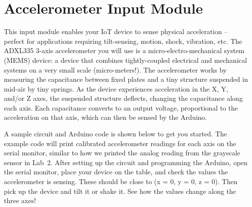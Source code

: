 
\clearpage
\section{Accelerometer Input Module}
\label{sec-input-accel}

This input module enables your IoT device to sense physical acceleration
-- perfect for applications requiring tilt-sensing, motion, shock,
vibration, etc. The ADXL335 3-axis accelerometer you will use is a
micro-electro-mechanical system (MEMS) device: a device that combines
tightly-coupled electrical and mechanical systems on a very small scale
(micro-meters!). The accelerometer works by measuring the capacitance
between fixed plates and a tiny structure suspended in mid-air by tiny
springs. As the device experiences acceleration in the X, Y, and/or Z
axes, the suspended structure deflects, changing the capacitance along
each axis. Each capacitance converts to an output voltage, proportional
to the acceleration on that axis, which can then be sensed by the
Arduino.

A sample circuit and Arduino code is shown below to get you started.
The example code will print calibrated accelerometer readings for each
axis on the serial monitor, similar to how we printed the analog reading
from the grayscale sensor in Lab~2. After setting up the circuit and
programming the Arduino, open the serial monitor, place your device on
the table, and check the values the accelerometer is sensing. These
should be close to (x = 0, y = 0, z = 0). Then pick up the device and
tilt it or shake it. See how the values change along the three axes!

